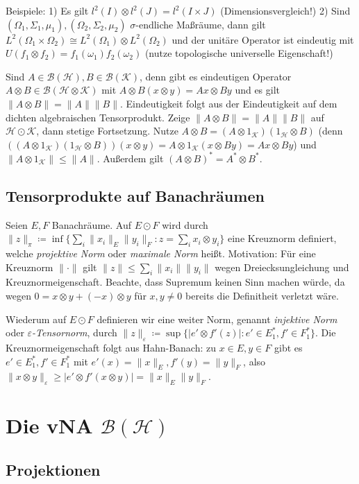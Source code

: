 \documentclass[11pt,a4paper]{scrartcl}
\newcommand{\Hc}{\mathcal{H}}
\newcommand{\Kc}{\mathcal{K}}
\newcommand{\B}{\mathcal{B}}
\theoremstyle{plain}
\theoremstyle{definition}
\theoremstyle{remark}
\begin{document}
Beispiele: 1) Es gilt $l^2(I)\otimes l^2(J) = l^2(I\times J)$ (Dimensionsvergleich!) 2) Sind $(\Omega_1, \Sigma_1,\mu_1), (\Omega_2,\Sigma_2,\mu_2)$ $\sigma$-endliche Maßräume, dann gilt $L^2(\Omega_1\times \Omega_2) \cong L^2(\Omega_1)\otimes L^2(\Omega_2)$ und der unitäre Operator ist eindeutig mit $U(f_1\otimes f_2) = f_1(\omega_1)f_2(\omega_2)$ (nutze topologische universelle Eigenschaft!)

Sind $A\in \B(\Hc), B\in \B(\Kc)$, denn gibt es eindeutigen Operator $A\otimes B\in \B(\Hc\otimes \Kc)$ mit $A\otimes B(x\otimes y)=Ax\otimes By$ und es gilt $\|A\otimes B\|=\|A\|\|B\|$. Eindeutigkeit folgt aus der Eindeutigkeit auf dem dichten algebraischen Tensorprodukt. Zeige $\|A\otimes B\|=\|A\|\|B\|$ auf $\Hc \odot \Kc$, dann stetige Fortsetzung. Nutze $A\otimes B=(A\otimes 1_\Kc)(1_\Hc\otimes B)$ (denn $((A\otimes 1_\Kc)(1_\Hc\otimes B))(x\otimes y)=A\otimes 1_\Kc(x\otimes By)=Ax\otimes By$) und $\|A\otimes 1_\Kc\| \leq \|A\|$. Außerdem gilt $(A\otimes B)^*=A^*\otimes B^*$.

\subsection{Tensorprodukte auf Banachräumen}

Seien $E,F$ Banachräume. Auf $E\odot F$ wird durch $\|z\|_\pi \coloneqq \inf \{ \sum_i \|x_i\|_E \|y_i\|_F: z = \sum_i x_i \otimes y_i \}$ eine Kreuznorm definiert, welche \emph{projektive Norm} oder \emph{maximale Norm} heißt. Motivation: Für eine Kreuznorm $\|\cdot\|$ gilt $\|z\|\leq \sum_i \|x_i\|\|y_i\|$ wegen Dreiecksungleichung und Kreuznormeigenschaft. Beachte, dass Supremum keinen Sinn machen würde, da wegen $0=x\otimes y + (-x)\otimes y$ für $x,y\neq 0$ bereits die Definitheit verletzt wäre.

Wiederum auf $E\odot F$ definieren wir eine weiter Norm, genannt \emph{injektive Norm} oder \emph{$\varepsilon$-Tensornorm}, durch $\|z\|_\varepsilon \coloneqq \sup \{ |e'\otimes f'(z)|: e'\in E^*_1, f'\in F^*_1 \}$. Die Kreuznormeigenschaft folgt aus Hahn-Banach: zu $x\in E, y\in F$ gibt es $e'\in E^*_1, f'\in F^*_1$ mit $e'(x)=\|x\|_E, f'(y)=\|y\|_F$, also $\|x\otimes y\|_\varepsilon \geq |e'\otimes f'(x\otimes y)|=\|x\|_E \|y\|_F$.

\section{Die vNA $\B(\Hc)$}

\subsection{Projektionen}
\end{document}
